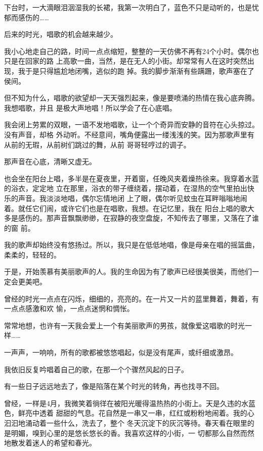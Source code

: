 \documentclass[12pt,a4paper]{article}
\def\blankrev{\vspace{1ex}}									%
\begin{document}
		下台时，一大滴眼泪洇湿我的长裙，我第一次明白了，蓝色不只是动听的，也是忧郁而感伤的……

		后来的时光，唱歌的机会越来越少。

		我小心地走自己的路，时间一点点缩短，整整的一天仿佛不再有24个小时。偶尔也只是在回家的路
	上高歌一曲，当然，是在无人的小街。却常常有人在这时突然出现，我于是只得尴尬地闭嘴，逃似的跑
	掉。我的脚步渐渐有些蹒跚，歌声塞在了侯间。

		但不知为什么，唱歌的欲望却一天天强烈起来，像是要喷涌的热情在我心底奔腾。我想唱歌，并且
	是极大声地唱！所以学会了在心底唱。

		我会闭上劳累的双眼，一语不发地唱歌，让一个个奇异而安静的音符在心头掠过。没有声音，却格
	外动听。不经意间，嘴角便露出一缕浅浅的笑。因为那歌声里有从前的无瑕，从前树们跳过的舞，从前
	哥哥轻哼过的调子。

		那声音在心底，清晰又虚无。

		也会坐在阳台上唱，多半是在夏夜里，开着窗，任晚风夹着燥热徐来。我穿着水蓝的浴衣，定定地
	立在那里，浴衣的带子缠绕着，摆动着，在湿热的空气里拍出快乐的声音。我淡淡地唱，偶尔忘情地闭
	上了眼，偶尔听见蚊虫在耳畔嗡嗡地闹着。就任它们闹，或许它们也是在唱歌，我想。在记忆里，我在
	阳台上唱的歌大多是感伤的。那声音飘飘缈缈，在寂静的夜空盘旋，不知传去了哪里，又落在了谁的窗
	前。

		我的歌声却始终没有悠扬过。所以，我只是在低低地唱，像是母亲在唱的摇篮曲，柔柔的，轻轻的。

		于是，开始羡慕有美丽歌声的人。我的生命因为有了歌声已经很美很美，而他们一定会更美吧。

		曾经的时光一点点在闪烁，细细的，亮亮的。在一片又一片的蓝里舞着，舞着，有一点点感激和欢
	愉，一点点迷惘和惆怅。

		常常地想，也许有一天我会爱上一个有美丽歌声的男孩，就像爱这唱歌的时光一样……

		一声声，一响响，所有的歌都被悠悠唱起，似是没有尾声，或纤细或激昂。

		我依旧反复吟唱着自己的歌，在那一个个骤然风起的日子。

	\endwriting



		有一些日子远远地去了，像是陷落在某个时光的转角，再也找寻不回。

		\blankrev
		曾经，一样是4月，我微笑着徜徉在被阳光暖得温热热的小街上。天是久违的水蓝色，鲜亮中透着
	甜甜的气息。花自然是一串又一串，红红或粉粉地闹着。我的心汩汩地涌动着一些什么，洗去了，整个
	冬天沉淀下的灰沉等待。春天看在眼里的是明媚，嗅到心里的是悠长悠长的香。我喜欢这样的小街，一
	切都那么自然而然地散发着迷人的希望和春光。
\end{document}
